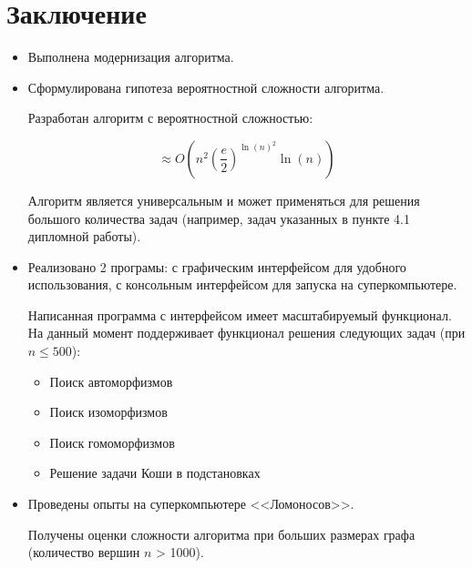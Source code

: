 \section*{Заключение}
\label{sec:Conclusion} 
\large

\begin{itemize}
\item Выполнена модернизация алгоритма.
\item Сформулирована гипотеза вероятностной сложности алгоритма.

Разработан алгоритм с вероятностной сложностью:

$$\approx O(n^2(\frac{e}{2})^{\ln(n)^2} \ln(n))$$

Алгоритм является универсальным и может применяться для решения большого количества задач (например, задач указанных в пункте 4.1 дипломной работы).

\item Реализовано 2 програмы: с графическим интерфейсом для удобного использования, с консольным интерфейсом для запуска на суперкомпьютере.

Написанная программа с интерфейсом имеет масштабируемый функционал. На данный момент поддерживает функционал решения следующих задач (при $n \leq  500$):

\begin{itemize}
\item Поиск автоморфизмов
\item Поиск изоморфизмов
\item Поиск гомоморфизмов
\item Решение задачи Коши в подстановках
\end{itemize}

\item Проведены опыты на суперкомпьютере <<Ломоносов>>.

Получены оценки сложности алгоритма при больших размерах графа (количество вершин $n$ > 1000).

\end{itemize}
